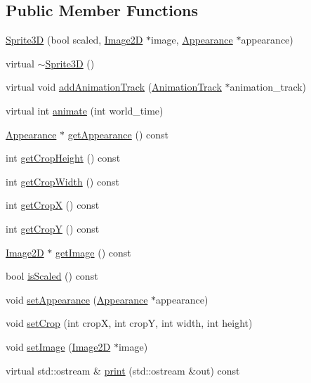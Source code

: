 \subsection*{Public Member Functions}
\begin{CompactItemize}
\item 
\hyperlink{classm3g_1_1Sprite3D_9cb33fd453d441ed8e99b95f5e29df0c}{Sprite3D} (bool scaled, \hyperlink{classm3g_1_1Image2D}{Image2D} $\ast$image, \hyperlink{classm3g_1_1Appearance}{Appearance} $\ast$appearance)
\item 
virtual \hyperlink{classm3g_1_1Sprite3D_a57bd1e3141ba11c88ddec1e46c188d6}{$\sim$Sprite3D} ()
\item 
virtual void \hyperlink{classm3g_1_1Sprite3D_415c0b110f95410ded9b85e5d99a496b}{addAnimationTrack} (\hyperlink{classm3g_1_1AnimationTrack}{AnimationTrack} $\ast$animation\_\-track)
\item 
virtual int \hyperlink{classm3g_1_1Sprite3D_8aad1ceab4c2a03609c8a42324ce484d}{animate} (int world\_\-time)
\item 
\hyperlink{classm3g_1_1Appearance}{Appearance} $\ast$ \hyperlink{classm3g_1_1Sprite3D_0219cb20ddea978a5796b5b414d012d2}{getAppearance} () const 
\item 
int \hyperlink{classm3g_1_1Sprite3D_d6d9d6f23b7bb004c93642bcd081f4a3}{getCropHeight} () const 
\item 
int \hyperlink{classm3g_1_1Sprite3D_5c6515f6706675ef31ca5dfa0a03b953}{getCropWidth} () const 
\item 
int \hyperlink{classm3g_1_1Sprite3D_d0ba0211183decc8f0459ca598b12912}{getCropX} () const 
\item 
int \hyperlink{classm3g_1_1Sprite3D_9ef03b219415a1f08aef6745ad5d87d0}{getCropY} () const 
\item 
\hyperlink{classm3g_1_1Image2D}{Image2D} $\ast$ \hyperlink{classm3g_1_1Sprite3D_a8c0193b0e7d47d4b5c9f60df24c44f5}{getImage} () const 
\item 
bool \hyperlink{classm3g_1_1Sprite3D_8e3e7fa70e1d3f2342580991105779f5}{isScaled} () const 
\item 
void \hyperlink{classm3g_1_1Sprite3D_b9b44bad4241635062ed66437c9bae48}{setAppearance} (\hyperlink{classm3g_1_1Appearance}{Appearance} $\ast$appearance)
\item 
void \hyperlink{classm3g_1_1Sprite3D_92660f9625c68b0169ee84bbc4586187}{setCrop} (int cropX, int cropY, int width, int height)
\item 
void \hyperlink{classm3g_1_1Sprite3D_705b89b41cd1b38f664ed912be44baaa}{setImage} (\hyperlink{classm3g_1_1Image2D}{Image2D} $\ast$image)
\item 
virtual std::ostream \& \hyperlink{classm3g_1_1Sprite3D_6fea17fa1532df3794f8cb39cb4f911f}{print} (std::ostream \&out) const 
\end{CompactItemize}
